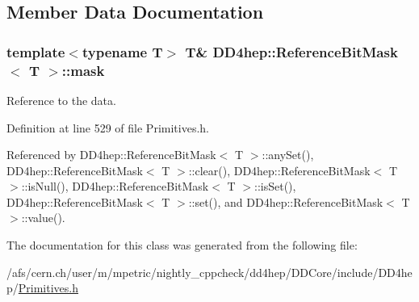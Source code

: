 \subsection{Member Data Documentation}
\hypertarget{class_d_d4hep_1_1_reference_bit_mask_aa770625de709649071feac5dc7ac1fc1}{
\subsubsection[{mask}]{\setlength{\rightskip}{0pt plus 5cm}template$<$typename T$>$ T\& {\bf DD4hep::ReferenceBitMask}$<$ T $>$::{\bf mask}}}
\label{class_d_d4hep_1_1_reference_bit_mask_aa770625de709649071feac5dc7ac1fc1}


Reference to the data. 

Definition at line 529 of file Primitives.h.

Referenced by DD4hep::ReferenceBitMask$<$ T $>$::anySet(), DD4hep::ReferenceBitMask$<$ T $>$::clear(), DD4hep::ReferenceBitMask$<$ T $>$::isNull(), DD4hep::ReferenceBitMask$<$ T $>$::isSet(), DD4hep::ReferenceBitMask$<$ T $>$::set(), and DD4hep::ReferenceBitMask$<$ T $>$::value().

The documentation for this class was generated from the following file:\begin{DoxyCompactItemize}
\item 
/afs/cern.ch/user/m/mpetric/nightly\_\-cppcheck/dd4hep/DDCore/include/DD4hep/\hyperlink{_primitives_8h}{Primitives.h}\end{DoxyCompactItemize}
